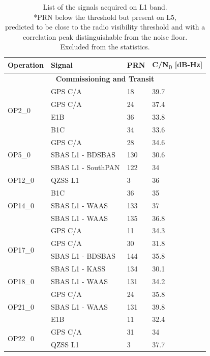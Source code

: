 \documentclass{IEEEtaes}
\begin{document}
\begin{table}[]
\scriptsize
\centering
\begin{minipage}{0.48\textwidth}
\caption{List of the signals acquired on L1 band. \\ *PRN below the threshold but present on L5,\\
predicted to be close to the radio visibility threshold and with a correlation peak
distinguishable from the noise floor.\\
Excluded from the statistics.}
\label{tab:ACQRESULTS}
\centering
\begin{tabular}{llll}
\hline
\textbf{Operation} & \textbf{Signal} & \textbf{PRN} & \textbf{C/N\textsubscript{0} [dB-Hz]} \\
\hline
\multicolumn{4}{c}{\textbf{Commissioning and Transit}} \\
\hline
\multirow{4}{*}{OP2\_0}
 & GPS C/A & 18  & 39.7 \\
 & GPS C/A & 24  & 37.4 \\
 & E1B     & 36  & 33.8 \\
 & B1C     & 34  & 33.6 \\
\midrule
\multirow{3}{*}{OP5\_0}
 & GPS C/A & 28  & 34.6 \\
 & SBAS L1 - BDSBAS  & 130 & 30.6  \\
 & SBAS L1 - SouthPAN & 122 & 34 \\
\midrule
\multirow{1}{*}{OP12\_0}
 & QZSS L1 & 3   & 36 \\
\midrule
\multirow{3}{*}{OP14\_0}
 & B1C     & 36  & 35 \\
 & SBAS L1 - WAAS    & 133 & 37 \\
 & SBAS L1 - WAAS    & 135 & 36.8 \\
\midrule
\multirow{4}{*}{OP17\_0}
 & GPS C/A & 11  & 34.3 \\
 & GPS C/A & 30  & 31.8 \\
 & SBAS L1 - BDSBAS  & 144 & 35.8 \\
 & SBAS L1 - KASS    & 134 & 30.1 \\
\midrule
\multirow{1}{*}{OP18\_0} 
 & SBAS L1 - WAAS  & 131 & 34.2 \\
 \midrule
 \multirow{3}{*}{OP21\_0}
 & GPS C/A & 24  & 35.8 \\
 & SBAS L1 - WAAS    & 131 & 39.8 \\
 & E1B     & 11  & 32.4 \\
 \midrule
  \multirow{3}{*}{OP22\_0}
 & GPS C/A & 31  & 34\\
 & QZSS L1 & 3  & 37.7 \\

\end{tabular}
\end{minipage}
\end{table}
\end{document}
